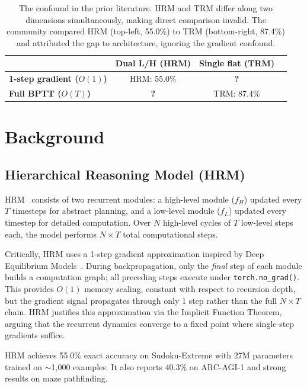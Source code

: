 \documentclass{article}
\begin{document}
\begin{table}[t]
\centering
\caption{The confound in the prior literature. HRM and TRM differ along two dimensions simultaneously, making direct comparison invalid. The community compared HRM (top-left, 55.0\%) to TRM (bottom-right, 87.4\%) and attributed the gap to architecture, ignoring the gradient confound.}
\label{tab:confound}
\begin{tabular}{lccc}
\toprule
& \textbf{Dual L/H (HRM)} & \textbf{Single flat (TRM)} \\
\midrule
\textbf{1-step gradient ($O(1)$)} & HRM: 55.0\% & \textbf{?} \\
\textbf{Full BPTT ($O(T)$)}     & \textbf{?} & TRM: 87.4\% \\
\bottomrule
\end{tabular}
\end{table}

\section{Background}

\subsection{Hierarchical Reasoning Model (HRM)}

HRM~\cite{wang2025hrm} consists of two recurrent modules: a high-level module ($f_H$) updated every $T$ timesteps for abstract planning, and a low-level module ($f_L$) updated every timestep for detailed computation. Over $N$ high-level cycles of $T$ low-level steps each, the model performs $N\times T$ total computational steps.

Critically, HRM uses a 1-step gradient approximation inspired by Deep Equilibrium Models~\cite{bai2019deq}. During backpropagation, only the \emph{final} step of each module builds a computation graph; all preceding steps execute under \texttt{torch.no\_grad()}. This provides $O(1)$ memory scaling, constant with respect to recursion depth, but the gradient signal propagates through only 1 step rather than the full $N\times T$ chain. HRM justifies this approximation via the Implicit Function Theorem, arguing that the recurrent dynamics converge to a fixed point where single-step gradients suffice.

HRM achieves 55.0\% exact accuracy on Sudoku-Extreme with 27M parameters trained on $\sim$1,000 examples. It also reports 40.3\% on ARC-AGI-1 and strong results on maze pathfinding.
\end{document}
